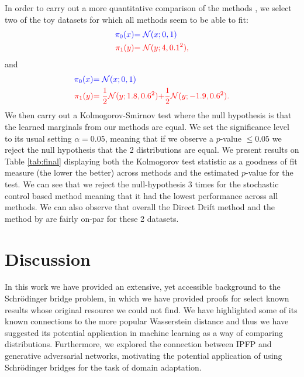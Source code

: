 \documentclass[a4paper,12pt,twoside,openright]{report}
\theoremstyle{definition}
\begin{document}
In order to carry out a more quantitative comparison of the methods , we select two of the toy datasets for which all methods seem to be able to fit:
\begin{align*}
\color{blue}{\pi_0(x)} &\color{blue}{= {\mathcal{N}}(x; 0,  1)} \\
    \color{red}{\pi_1(y)} &\color{red}{= {\mathcal{N}}(y; 4, 0.1^2)} ,
\end{align*}
and
\begin{align*}
     \color{blue}{\pi_0(x)} &\color{blue}{= {\mathcal{N}}(x; 0,  1)} \\
    \color{red}{\pi_1(y)} &\color{red}{= \frac{1}{2}{\mathcal{N}}(y; 1.8, 0.6 ^2)}\color{red}{ + \frac{1}{2}{\mathcal{N}}(y; -1.9, 0.6 ^2) }.
\end{align*}
We then carry out a Kolmogorov-Smirnov \citep{kolmogorov1933sulla} test where the null hypothesis is that the learned marginals from our methods are equal. We set the significance level to its usual setting  $\alpha=0.05$, meaning that if we observe a $p$-value $\leq 0.05$ we reject the null hypothesis that the 2 distributions are equal. We present results on Table \ref{tab:final} displaying both the Kolmogorov test statistic as a goodness of fit measure (the lower the better) across methods and the estimated $p$-value for the test. We can see that we reject the null-hypothesis 3 times for the stochastic control based method meaning that it had the lowest performance across all methods. We can also observe that overall the Direct Drift method and the method by \cite{pavon2018data} are fairly on-par for these 2 datasets.
\chapter{Discussion}

In this work we have provided an extensive, yet accessible background  to the Schrödinger bridge problem, in which we have provided proofs for select known results whose original resource we could not find. We have highlighted some of its known connections to the more popular Wasserstein distance and thus we have suggested its potential application in machine learning as a way of comparing distributions. Furthermore, we explored the connection between IPFP and generative adversarial networks, motivating the potential application of using Schrödinger bridges for the task of domain adaptation.
\end{document}
